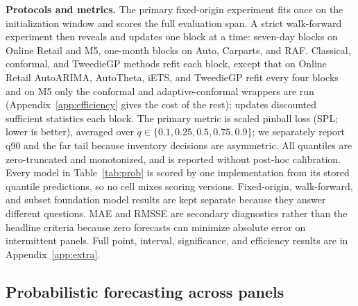 \textbf{Protocols and metrics.} The primary fixed-origin experiment fits
once on the initialization window and scores the full evaluation span.
A strict walk-forward experiment then reveals and updates one block at a
time: seven-day blocks on Online Retail and M5, one-month blocks on Auto,
Carparts, and RAF. Classical, conformal, and TweedieGP methods refit each
block, except that on Online Retail AutoARIMA, AutoTheta, iETS, and
TweedieGP refit every four blocks and on M5 only the conformal and
adaptive-conformal wrappers are run (Appendix~\ref{app:efficiency} gives
the cost of the rest); \EBB{} updates discounted sufficient statistics
each block. The primary metric is
scaled pinball loss (SPL; lower is better), averaged over
$q\in\{0.1,0.25,0.5,0.75,0.9\}$; we separately report q90 and the far tail
because inventory decisions are asymmetric. All quantiles are
zero-truncated and monotonized, and \EBB{} is reported without post-hoc
calibration. Every model in Table~\ref{tab:prob} is scored by one
implementation from its stored quantile predictions, so no cell mixes
scoring versions. Fixed-origin, walk-forward, and subset foundation model
results are kept separate because they answer different questions. MAE and
RMSSE are secondary diagnostics rather than the headline criteria because
zero forecasts can minimize absolute error on intermittent panels. Full
point, interval, significance, and efficiency results are in
Appendix~\ref{app:extra}.

\subsection{Probabilistic forecasting across panels}
\label{sec:main-results}

